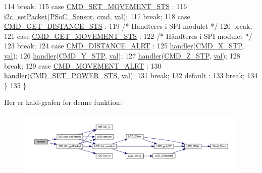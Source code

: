 \begin{DoxyCode}
114       \textcolor{keywordflow}{break};
115     \textcolor{keywordflow}{case} \hyperlink{handler_8h_a84f8a23b131cb2b163e16889afd9ef85}{CMD\_SET\_MOVEMENT\_STS} :
116       \hyperlink{i2c_8h_a0e13c9c7d87ebdb3680495a787f68d29}{i2c\_setPacket}(\hyperlink{i2c_8h_adc44ca05813864518773ea6f3543816c}{PSoC\_Sensor}, \hyperlink{queue_8h_a85092d82ab6ea85dad51ba78cbda36a0}{cmd}, \hyperlink{queue_8h_aa0ccb5ee6d882ee3605ff47745c6467b}{val});
117       \textcolor{keywordflow}{break};
118     \textcolor{keywordflow}{case} \hyperlink{handler_8h_a8ea17eed84662f9389bfa1751c03a4b2}{CMD\_GET\_DISTANCE\_STS} :
119       \textcolor{comment}{/* Håndteres i SPI modulet */}
120       \textcolor{keywordflow}{break};
121     \textcolor{keywordflow}{case} \hyperlink{handler_8h_a4adcfb68de1b319e19342143cb61b550}{CMD\_GET\_MOVEMENT\_STS} :
122       \textcolor{comment}{/* Håndteres i SPI modulet */}
123       \textcolor{keywordflow}{break};
124     \textcolor{keywordflow}{case} \hyperlink{handler_8h_a17dc606d3dbd6f9d4ca831cb02c91af0}{CMD\_DISTANCE\_ALRT} :
125       \hyperlink{class_handler_af5be5b016b862943cd22504490acc8f4}{handler}(\hyperlink{handler_8h_af7c8f19d1c1b9e2240251d42109c5cfd}{CMD\_X\_STP}, \hyperlink{queue_8h_aa0ccb5ee6d882ee3605ff47745c6467b}{val});
126       \hyperlink{class_handler_af5be5b016b862943cd22504490acc8f4}{handler}(\hyperlink{handler_8h_a83ab3037b2c91ea010b2d8c47acd5434}{CMD\_Y\_STP}, \hyperlink{queue_8h_aa0ccb5ee6d882ee3605ff47745c6467b}{val});
127       \hyperlink{class_handler_af5be5b016b862943cd22504490acc8f4}{handler}(\hyperlink{handler_8h_ad119aef78e8cb8e9aa12f35aeae94a99}{CMD\_Z\_STP}, \hyperlink{queue_8h_aa0ccb5ee6d882ee3605ff47745c6467b}{val});
128       \textcolor{keywordflow}{break};
129     \textcolor{keywordflow}{case} \hyperlink{handler_8h_a7bd43223cfa796f0289d0548e090bbcc}{CMD\_MOVEMENT\_ALRT} :
130       \hyperlink{class_handler_af5be5b016b862943cd22504490acc8f4}{handler}(\hyperlink{handler_8h_a1fe6f15c7c98032dc2bd2a1417977fcf}{CMD\_SET\_POWER\_STS}, \hyperlink{queue_8h_aa0ccb5ee6d882ee3605ff47745c6467b}{val});
131       \textcolor{keywordflow}{break};
132     \textcolor{keywordflow}{default} :
133       \textcolor{keywordflow}{break};
134   \}
135 \}
\end{DoxyCode}


Her er kald-\/grafen for denne funktion\+:\nopagebreak
\begin{figure}[H]
\begin{center}
\leavevmode
\includegraphics[width=350pt]{d2/d01/class_handler_af5be5b016b862943cd22504490acc8f4_cgraph}
\end{center}
\end{figure}




